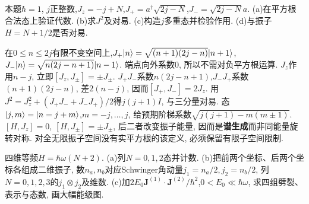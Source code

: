 \begin{exercise}
本题$\hbar=1$, $j$正整数,$J_z=-j+N$,$J_+=a^\dagger\sqrt{2j-N}$,$J_-=\sqrt{2j-N}a$. (a)在平方根合法态上验证代数. (b)求$J^2$及对易. (c)构造$j$多重态并检验作用. (d)与振子$H=N+1/2$是否对易.
\end{exercise}
\begin{solution}
在$0\leq n\leq2j$有限不变空间上,$J_+\lvert n\rangle=\sqrt{(n+1)(2j-n)}\lvert n+1\rangle$,$J_-\lvert n\rangle=\sqrt{n(2j-n+1)}\lvert n-1\rangle$. 端点向外系数0, 所以不需对负平方根运算. $J_z$作用$n-j$, 立即$[J_z,J_\pm]=\pm J_\pm$. $J_+J_-$系数$n(2j-n+1)$,$J_-J_+$系数$(n+1)(2j-n)$, 差$2(n-j)$, 因而$[J_+,J_-]=2J_z$. 用$J^2=J_z^2+(J_+J_-+J_-J_+)/2$得$j(j+1)I$, 与三分量对易. 态$\lvert j,m\rangle=\lvert n=j+m\rangle$,$m=-j,\ldots,j$, 给预期阶梯系数$\sqrt{j(j+1)-m(m\pm1)}$. $[H,J_z]=0$, $[H,J_\pm]=\pm J_\pm$, 后二者改变振子能量, 因而是\textbf{谱生成}而非同能量旋转对称. 对全无限振子空间没有实平方根的该定义, 必须保留有限子空间限制.
\end{solution}
\begin{exercise}
四维等频$H=\hbar\omega(N+2)$. (a)列$N=0,1,2$态并计数. (b)把前两个坐标、后两个坐标各组成二维振子, 数$n_a,n_b$对应Schwinger角动量$j_1=n_a/2,j_2=n_b/2$, 列$N=0,1,2,3$的$j_1\otimes j_2$及维数. (c)加$2E_0\boldsymbol J^{(1)}\cdot\boldsymbol J^{(2)}/\hbar^2$,$0<E_0\ll\hbar\omega$, 求四组劈裂、表示与态数, 画大幅能级图.
\end{exercise}
